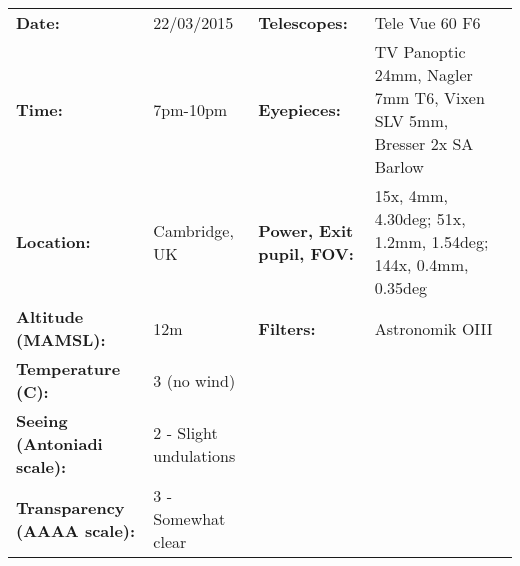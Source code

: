 \begin{tabular}{ p{1.7in} p{1.2in} p{1.5in} p{4.2in}}
{\bf Date:} & 22/03/2015 & {\bf Telescopes:} & Tele Vue 60 F6 \\ 
{\bf Time:} & 7pm-10pm & {\bf Eyepieces:} & TV Panoptic 24mm, Nagler 7mm T6, Vixen SLV 5mm, Bresser 2x SA Barlow \\ 
{\bf Location:} & Cambridge, UK & {\bf Power, Exit pupil, FOV:} & 15x, 4mm, 4.30deg; 51x, 1.2mm, 1.54deg; 144x, 0.4mm, 0.35deg \\ 
{\bf Altitude (MAMSL):} & 12m & {\bf Filters:} & Astronomik OIII \\ 
{\bf Temperature (C):} & 3 (no wind) & & \\ 
{\bf Seeing (Antoniadi scale):} & 2 - Slight undulations & & \\ 
{\bf Transparency (AAAA scale):} & 3 - Somewhat clear & & \\ 
\end{tabular}
\centering 
